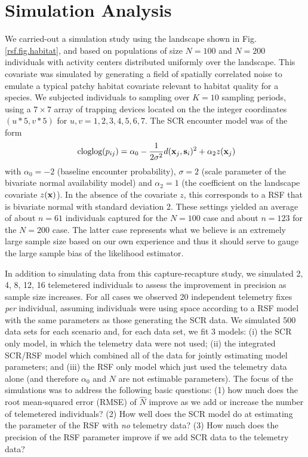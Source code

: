 \documentclass[12pt]{article}
\begin{document}
\section{Simulation Analysis}


We carried-out a simulation study using the landscape shown in
Fig. \ref{rsf.fig.habitat}, and based on populations of size $N=100$ and $N=200$
individuals with activity centers distributed uniformly over the
landscape.  This covariate was simulated by generating a field
of spatially correlated noise to emulate a typical patchy habitat
covariate relevant to habitat quality for a species.  We subjected individuals
to sampling over $K=10$ sampling periods, using a $7 \times 7$ array
of trapping devices located on the the integer coordinates $(u*5,v*5)$
for $u,v = 1,2,3,4,5,6,7$. The SCR encounter model was of the form
\[
\mbox{ cloglog}(p_{ij}) = \alpha_{0}  -\frac{1}{2\sigma^{2}}
d({\bf x}_{j},{\bf s}_{i})^{2} + \alpha_{2}  z({\bf x}_{j})
\]
with $\alpha_{0} = -2$ (baseline encounter probability), $\sigma =2$
(scale parameter of the bivariate normal availability model) and
$\alpha_{2} = 1$ (the coefficient on the landscape covariate $z({\bf
  x})$).  In the absence of the covariate $z$, this corresponds to a
RSF that is bivariate normal with standard deviation 2.  These
settings yielded an average of about $n=61$ individuals captured for
the $N=100$ case and about $n=123$ for the $N=200$ case. The latter
case represents what we believe is an extremely large sample size
based on our own experience and thus it should serve to gauge the
large sample bias of the likelihood estimator.


In addition to simulating data from this capture-recapture study, we
simulated 2, 4, 8, 12, 16 telemetered individuals to assess the
improvement in precision as sample size increases.  For all cases we
observed 20 independent telemetry fixes {\it per} individual, assuming
individuals were using space according to a RSF model with the same
parameters as those generating the SCR data. We simulated 500 data
sets for each scenario and, for each data set, we fit 3 models: (i)
the SCR only model, in which the telemetry data were not used; (ii)
the integrated SCR/RSF model which combined all of the data for
jointly estimating model parameters; and (iii) the RSF only model
which just used the telemetry data alone (and therefore $\alpha_{0}$
and $N$ are not estimable parameters).  The focus of the simulations
was to address the following basic questions: (1) how much does the
root mean-squared error (RMSE) of $\hat{N}$ improve as we add or
increase the number of telemetered individuals?  (2) How well does the
SCR model do at estimating the parameter of the RSF with {\it no}
telemetry data?  (3) How much does the precision of the RSF parameter
improve if we add SCR data to the telemetry data?
\end{document}
